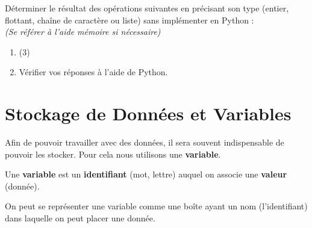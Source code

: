 \begin{boxexstheorieligne}
\eexo
\pagebreak[3]





\exo
Déterminer le résultat des opérations suivantes en précisant son type (entier, flottant, chaîne de caractère ou liste) sans implémenter en Python :\\
\textit{\small (Se référer à l'aide mémoire si nécessaire)}

\begin{enumerate}[label=\alph*),left=0mm, itemsep=3mm]
\item \leavevmode\vspace{-\dimexpr\baselineskip+\topsep}%
\begin{tasks}[label=\roman*),after-item-skip=4mm,label-width=9mm,label-align=right,column-sep=2mm](3)
\task {}
\task \comp{\gui 11\gui+2\mul \gui 3\gui}
\task {}
\task {}
\task {}
\task {}
\task {}
\task {}
\task {}
\task {} 
\task {}
\task {}
\task {}
\task {}
\task {}
\task {}
\end{tasks}
\item Vérifier vos réponses à l'aide de Python.

\end{enumerate}
\end{boxexstheorieligne}
\clearpage



\section{Stockage de Données et Variables}
\label{sec:stockdonnee}

Afin de pouvoir travailler avec des données, il sera souvent indispensable de pouvoir les stocker. Pour cela nous utilisons une \textbf{variable}.

\medskip
\begin{definition}
Une \textbf{variable} est un \textbf{identifiant} (mot, lettre) auquel on associe une \textbf{valeur} (donnée).

\medskip
On peut se représenter une variable comme une boîte ayant un nom (l'identifiant) dans laquelle on peut placer une donnée.

\end{definition}

